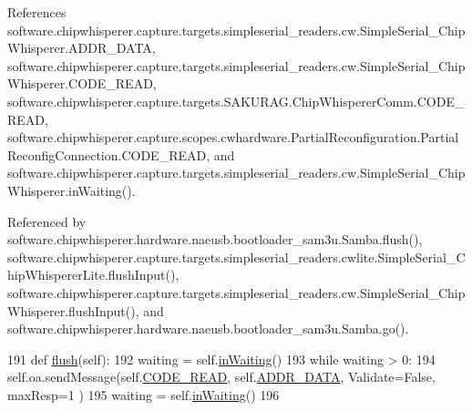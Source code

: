 References software.\+chipwhisperer.\+capture.\+targets.\+simpleserial\+\_\+readers.\+cw.\+Simple\+Serial\+\_\+\+Chip\+Whisperer.\+A\+D\+D\+R\+\_\+\+D\+A\+T\+A, software.\+chipwhisperer.\+capture.\+targets.\+simpleserial\+\_\+readers.\+cw.\+Simple\+Serial\+\_\+\+Chip\+Whisperer.\+C\+O\+D\+E\+\_\+\+R\+E\+A\+D, software.\+chipwhisperer.\+capture.\+targets.\+S\+A\+K\+U\+R\+A\+G.\+Chip\+Whisperer\+Comm.\+C\+O\+D\+E\+\_\+\+R\+E\+A\+D, software.\+chipwhisperer.\+capture.\+scopes.\+cwhardware.\+Partial\+Reconfiguration.\+Partial\+Reconfig\+Connection.\+C\+O\+D\+E\+\_\+\+R\+E\+A\+D, and software.\+chipwhisperer.\+capture.\+targets.\+simpleserial\+\_\+readers.\+cw.\+Simple\+Serial\+\_\+\+Chip\+Whisperer.\+in\+Waiting().



Referenced by software.\+chipwhisperer.\+hardware.\+naeusb.\+bootloader\+\_\+sam3u.\+Samba.\+flush(), software.\+chipwhisperer.\+capture.\+targets.\+simpleserial\+\_\+readers.\+cwlite.\+Simple\+Serial\+\_\+\+Chip\+Whisperer\+Lite.\+flush\+Input(), software.\+chipwhisperer.\+capture.\+targets.\+simpleserial\+\_\+readers.\+cw.\+Simple\+Serial\+\_\+\+Chip\+Whisperer.\+flush\+Input(), and software.\+chipwhisperer.\+hardware.\+naeusb.\+bootloader\+\_\+sam3u.\+Samba.\+go().


\begin{DoxyCode}
191     \textcolor{keyword}{def }\hyperlink{classsoftware_1_1chipwhisperer_1_1capture_1_1targets_1_1simpleserial__readers_1_1cw_1_1SimpleSerial__ChipWhisperer_ae994e4c2d2a33e4e2c58627eaceac0d3}{flush}(self):
192         waiting = self.\hyperlink{classsoftware_1_1chipwhisperer_1_1capture_1_1targets_1_1simpleserial__readers_1_1cw_1_1SimpleSerial__ChipWhisperer_a37a879ec32f504dde4babaffa22e6dbb}{inWaiting}()
193         \textcolor{keywordflow}{while} waiting > 0:
194             self.oa.sendMessage(self.\hyperlink{classsoftware_1_1chipwhisperer_1_1capture_1_1targets_1_1simpleserial__readers_1_1cw_1_1SimpleSerial__ChipWhisperer_a4c5517e6c34f42b975c6d04e9622eed2}{CODE\_READ}, self.\hyperlink{classsoftware_1_1chipwhisperer_1_1capture_1_1targets_1_1simpleserial__readers_1_1cw_1_1SimpleSerial__ChipWhisperer_ad06c94d7a635f177528b268ee4d1e4f7}{ADDR\_DATA}, Validate=\textcolor{keyword}{False}, maxResp=1
      )
195             waiting = self.\hyperlink{classsoftware_1_1chipwhisperer_1_1capture_1_1targets_1_1simpleserial__readers_1_1cw_1_1SimpleSerial__ChipWhisperer_a37a879ec32f504dde4babaffa22e6dbb}{inWaiting}()
196 
\end{DoxyCode}
\hypertarget{classsoftware_1_1chipwhisperer_1_1capture_1_1targets_1_1simpleserial__readers_1_1cw_1_1SimpleSerial__ChipWhisperer_a2e18d24e0adabe53607d2c90aea19fc9}{}
